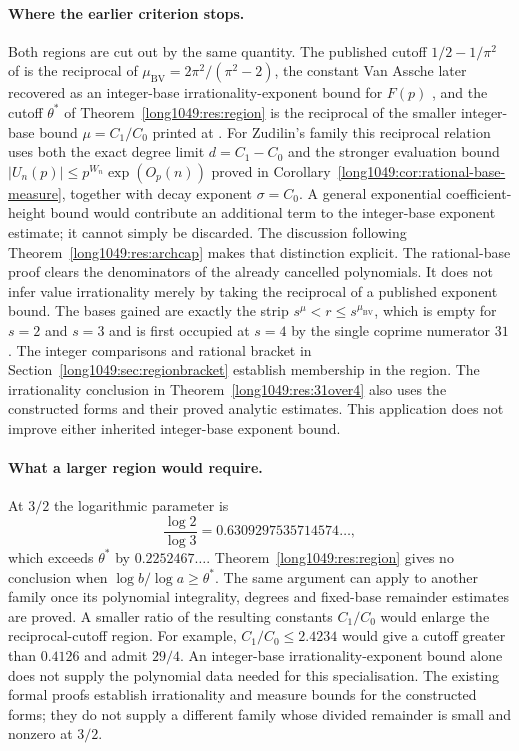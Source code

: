 \paragraph{Where the earlier criterion stops.}
Both regions are cut out by the same quantity.  The published cutoff
$1/2-1/\pi^{2}$ of \cite[Thm.~2, p.~177]{bv1994} is the reciprocal of
$\mu_{\mathrm{BV}}=2\pi^{2}/(\pi^{2}-2)$, the constant Van Assche later
recovered as an integer-base irrationality-exponent bound for $F(p)$
\cite[Thm.~1, p.~10]{vanassche2001}, and the cutoff $\theta^{*}$ of
Theorem~\ref{long1049:res:region} is the reciprocal of the smaller integer-base bound
$\mu=C_1/C_0$ printed at \cite[p.~162]{zudilin2004}.  For Zudilin's family this reciprocal relation uses both the exact degree
limit $d=C_1-C_0$ and the stronger evaluation bound
$|U_n(p)|\le p^{W_n}\exp(O_p(n))$ proved in
Corollary~\ref{long1049:cor:rational-base-measure}, together with decay
exponent $\sigma=C_0$. A general exponential coefficient-height bound
would contribute an additional term to the integer-base exponent
estimate; it cannot simply be discarded. The discussion following
Theorem~\ref{long1049:res:archcap} makes that distinction explicit.
The rational-base proof clears the denominators of the already
cancelled polynomials. It does not infer value irrationality merely by
taking the reciprocal of a published exponent bound.  The bases
gained are exactly the strip $s^{\mu}<r\le s^{\mu_{\mathrm{BV}}}$, which is empty
for $s=2$ and $s=3$ and is first occupied at $s=4$ by the single coprime numerator
$31$.  The integer comparisons and rational bracket in
Section~\ref{long1049:sec:regionbracket} establish membership in the region.
The irrationality conclusion in Theorem~\ref{long1049:res:31over4} also uses
the constructed forms and their proved analytic estimates. This application
does not improve either inherited integer-base exponent bound.

\paragraph{What a larger region would require.}
At $3/2$ the logarithmic parameter is
\[
 \frac{\log2}{\log3}=0.6309297535714574\ldots,
\]
which exceeds $\theta^*$ by $0.2252467\ldots$.
Theorem~\ref{long1049:res:region} gives no conclusion when
$\log b/\log a\ge\theta^*$. The same argument can apply to another family
once its polynomial integrality, degrees and fixed-base remainder
estimates are proved. A smaller ratio of the resulting constants
$C_1/C_0$ would enlarge the reciprocal-cutoff region. For example,
$C_1/C_0\le2.4234$ would give a cutoff greater than $0.4126$ and admit
$29/4$. An integer-base irrationality-exponent bound alone does not
supply the polynomial data needed for this specialisation.
The existing formal proofs establish irrationality and measure bounds
for the constructed forms; they do not supply a different family
whose divided remainder is small and nonzero at $3/2$.

